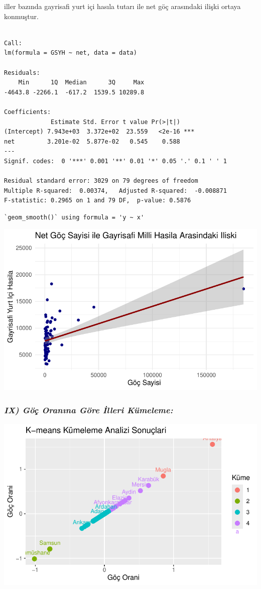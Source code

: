 \documentclass[
  11pt,
  a4paper,
  DIV=11,
  numbers=noendperiod]{scrartcl}
\begin{document}
iller bazında gayrisafi yurt içi hasıla tutarı ile net göç arasındaki
ilişki ortaya konmuştur.

\begin{verbatim}

Call:
lm(formula = GSYH ~ net, data = data)

Residuals:
    Min      1Q  Median      3Q     Max 
-4643.8 -2266.1  -617.2  1539.5 10289.8 

Coefficients:
             Estimate Std. Error t value Pr(>|t|)    
(Intercept) 7.943e+03  3.372e+02  23.559   <2e-16 ***
net         3.201e-02  5.877e-02   0.545    0.588    
---
Signif. codes:  0 '***' 0.001 '**' 0.01 '*' 0.05 '.' 0.1 ' ' 1

Residual standard error: 3029 on 79 degrees of freedom
Multiple R-squared:  0.00374,   Adjusted R-squared:  -0.008871 
F-statistic: 0.2965 on 1 and 79 DF,  p-value: 0.5876
\end{verbatim}

\begin{verbatim}
`geom_smooth()` using formula = 'y ~ x'
\end{verbatim}

\includegraphics{project_files/figure-pdf/unnamed-chunk-10-1.pdf}

\subsubsection{\texorpdfstring{\emph{IX) Göç Oranına Göre İlleri
Kümeleme:}}{IX) Göç Oranına Göre İlleri Kümeleme:}}\label{ix-guxf6uxe7-oranux131na-guxf6re-illeri-kuxfcmeleme}

\includegraphics{project_files/figure-pdf/unnamed-chunk-11-1.pdf}
\end{document}
